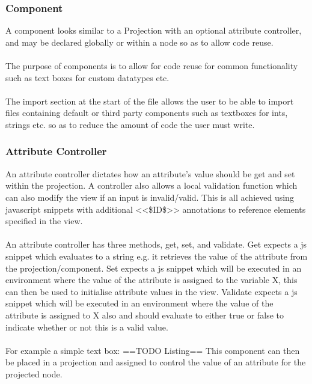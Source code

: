 \documentclass{article}
\begin{document}
\subsubsection{Component}


A component looks similar to a  Projection with an optional attribute controller, and may be declared globally or within a node so as to allow code reuse.
\\
\\
The purpose of components is to allow for code reuse for common functionality such as text boxes for custom datatypes etc.
\\
\\
The import section at the start of the file allows the user to be able to import files containing default or third party components such as textboxes for ints, strings etc. so as to reduce the amount of code the user must write. 

\subsubsection{Attribute Controller}

An attribute controller dictates how an attribute's value should be get and set within the projection. A controller also allows a local validation function which can also modify the view if an input is invalid/valid. This is all achieved using javascript snippets with additional <<\$ID\$>> annotations to reference elements specified in the view.
\\
\\
An attribute controller has three methods, get, set, and validate. Get expects a js snippet which evaluates to a string e.g. it retrieves the value of the attribute from the projection/component. Set expects a js snippet which will be executed in an environment where the value of the attribute is assigned to the variable X, this can then be used to initialise attribute values in the view. Validate expects a js snippet which will be executed in an environment where the value of the attribute is assigned to X also and should evaluate to either true or false to indicate whether or not this is a valid value. 
\\
\\
For example a simple text box: ==TODO Listing==
This component can then be placed in a projection and assigned to control the value of an attribute for the projected node.
\end{document}
